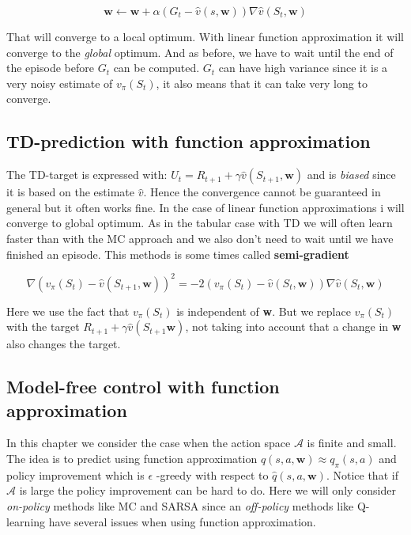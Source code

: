 	\begin{equation}
		\textbf{w} \leftarrow \textbf{w} + \alpha (G_t - \hat{v}(s, \textbf{w}))\nabla \hat{v}(S_t, \textbf{w})
	\end{equation} 

That will converge to a local optimum. With linear function approximation it will converge to the \emph{global} optimum. And as before, we have to wait until the end of the episode before $G_t$ can be computed. $G_t$ can have high variance since it is a very noisy estimate of $v_\pi(S_t)$, it also means that it can take very long to converge.

\subsection*{TD-prediction with function approximation}
The TD-target is expressed with: $U_t = R_{t+1} + \gamma \hat{v}(S_{t+1}, \textbf{w})$ and is \emph{biased} since it is based on the estimate $\hat{v}$. Hence the convergence cannot be guaranteed in general but it often works fine. In the case of linear function approximations i will converge to global optimum. As in the tabular case with TD we will often learn faster than with the MC approach and we also don't need to wait until we have finished an episode. This methods is some times called \textbf{semi-gradient}

	\begin{equation}
		\nabla (v_\pi(S_t) - \hat{v}(S_{t+1},\textbf{w}))^{2} = -2 (v_\pi(S_t) - \hat{v}(S_t, \textbf{w}))\nabla \hat{v}(S_t,\textbf{w})
	\end{equation}

Here we use the fact that $v_\pi(S_t)$ is independent of \textbf{w}. But we replace $v_\pi(S_t)$ with the target $R_{t+1} + \gamma \hat{v}(S_{t+1} \textbf{w})$, not taking into account that a change in \textbf{w} also changes the target.

\subsection*{Model-free control with function approximation}
In this chapter we consider the case when the action space $\mathcal{A}$ is finite and small. The idea is to predict using function approximation $\hat{q}(s,a,\textbf{w}) \approx q_\pi(s,a)$ and policy improvement which is $\epsilon$ 
-greedy with respect to $\hat{q}(s,a,\textbf{w})$. Notice that if $\mathcal{A}$ is large the policy improvement can be hard to do. Here we will only consider \emph{on-policy} methods like MC and SARSA since an \emph{off-policy} methods like Q-learning have several issues when using function approximation.


